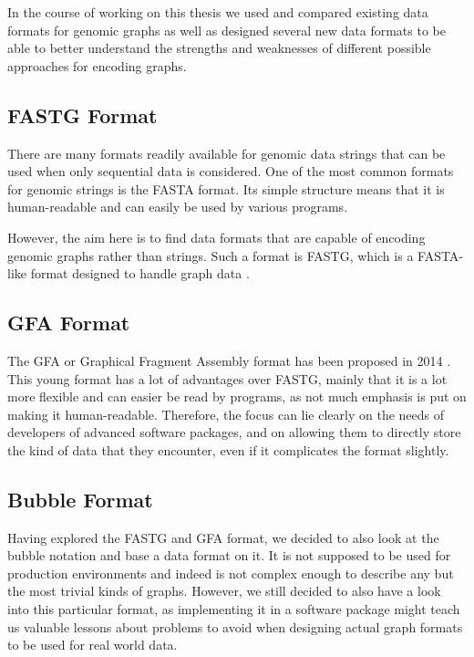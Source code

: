 \documentclass[a4paper,12pt,twoside,BCOR=10mm]{scrbook}
\begin{document}
In the course of working on this thesis we used and compared existing data 
formats for genomic graphs as well as designed several new data formats 
to be able to better understand the strengths and weaknesses of 
different possible approaches for encoding graphs.

\subsection{FASTG Format}

There are many formats readily available for genomic data strings 
that can be used when only sequential data is considered. 
One of the most common formats for genomic strings is the FASTA format. 
Its simple structure means that it is human-readable 
and can easily be used by various programs.

However, the aim here is to find data formats that are capable of 
encoding genomic graphs rather than strings. 
Such a format is FASTG, which is 
a FASTA-like format designed to handle graph data \citep{specFASTG}. 


\subsection{GFA Format}

The GFA or Graphical Fragment Assembly format 
has been proposed in 2014 \citep{specGFA1,specGFA2}. 
This young format has a lot of advantages over FASTG, mainly 
that it is a lot more flexible and can easier be read by programs, 
as not much emphasis is put on making it human-readable. 
Therefore, the focus can lie clearly on the needs of developers of advanced software packages, 
and on allowing them to directly store the kind of data that they encounter, 
even if it complicates the format slightly.


\subsection{Bubble Format}

Having explored the FASTG and GFA format, we decided to also look 
at the bubble notation and base a data format on it. 
It is not supposed to be used for production environments and indeed 
is not complex enough to describe any but the most trivial kinds of graphs. 
However, we still decided to also have a look into this particular format, 
as implementing it in a software package might teach us valuable lessons 
about problems to avoid when designing actual graph formats to be used for real world data.
\end{document}
